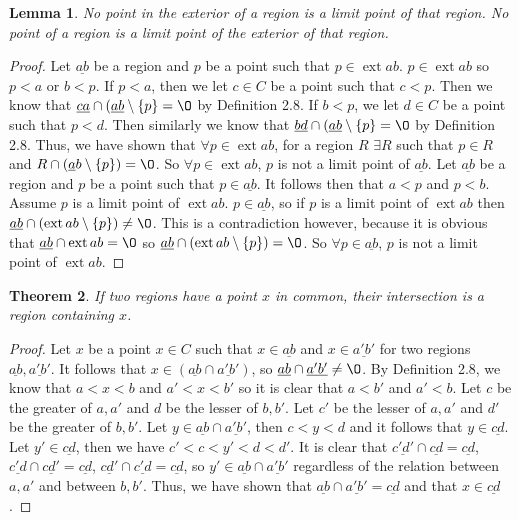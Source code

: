 \documentclass[12pt]{article}
\renewcommand{\emptyset}{\O}
\renewcommand{\_}[1]{\underline{ #1 }}
\DeclareMathOperator{\ext}{ext}
\newtheorem{theorem}{Theorem}[section]
\newtheorem{lemma}[theorem]{Lemma}
\theoremstyle{definition}
\numberwithin{equation}{subsection}
\begin{document}
\begin{lemma}  No point in the exterior of a region is a limit point of that region.  No point of a region is a limit point of the exterior of that region.
\end{lemma}

\begin{proof}
Let $\_{ab}$ be a region and $p$ be a point such that $p \in \ext{ab}$. $p \in \ext{ab}$ so $p < a$ or $b < p$. If $p < a$, then we let $c \in C$ be a point such that $c < p$. Then we know that $\_{ca} \cap (\_{ab} \setminus \{p\} = \emptyset$ by Definition 2.8. If $b < p$, we let $d \in C$ be a point such that $p < d$. Then similarly we know that $\_{bd} \cap (\_{ab} \setminus \{p\} = \emptyset$ by Definition 2.8. Thus, we have shown that $\forall p \in \ext{ab}$, for a region $R$ $\exists R$ such that $p \in R$ and $R \cap (\_ab \setminus \{p\}) = \emptyset$. So $\forall p \in \ext{ab}$, $p$ is not a limit point of $\_{ab}$.
Let $\_{ab}$ be a region and $p$ be a point such that $p \in \_{ab}$. It follows then that $a < p$ and $p < b$. Assume $p$ is a limit point of $\ext{ab}$. $p \in \_{ab}$, so if $p$ is a limit point of $\ext{ab}$ then $\_{ab} \cap (\ext{ab} \setminus \{p\}) \neq \emptyset$. This is a contradiction however, because it is obvious that $\_{ab} \cap \ext{ab} = \emptyset$ so $\_{ab} \cap (\ext{ab} \setminus \{p\}) = \emptyset$. So $\forall p \in \_{ab}$, $p$ is not a limit point of $\ext{ab}$.
\end{proof}

\begin{theorem}  If two regions have a point $x$ in common, their intersection is a region containing $x$.
\end{theorem}

\begin{proof}
Let $x$ be a point $x \in C$ such that $x \in \_{ab}$ and $x \in \_{a'b'}$ for two regions $\_{ab}, \_{a'b'}$. It follows that $x \in (\_{ab} \cap \_{a'b'})$, so $\_{ab} \cap \_{a'b'} \neq \emptyset$. By Definition 2.8, we know that $a < x < b$ and $a' < x < b'$ so it is clear that $a < b'$ and $a' < b$. Let $c$ be the greater of $a, a'$ and $d$ be the lesser of $b, b'$. Let $c'$ be the lesser of $a, a'$ and $d'$ be the greater of $b, b'$. Let $y \in \_{ab} \cap \_{a'b'}$, then $c < y < d$ and it follows that $y \in \_{cd}$. Let $y' \in \_{cd}$, then we have $c' < c < y' < d < d'$. It is clear that $\_{c'd'} \cap \_{cd} = \_{cd}$, $\_{c'd} \cap \_{cd'} = \_{cd}$, $\_{cd'} \cap \_{c'd} = \_{cd}$, so $y' \in \_{ab} \cap \_{a'b'}$ regardless of the relation between $a, a'$ and between $b, b'$. Thus, we have shown that $\_{ab} \cap \_{a'b'} = \_{cd}$ and that $x \in \_{cd}$.
\end{proof}
\end{document}
